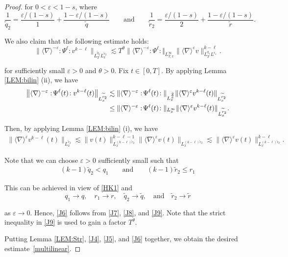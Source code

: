 \documentclass[letterpaper, 11pt,  reqno]{amsart}
\newcommand{\1}{\hspace{0.5mm}\text{I}\hspace{0.5mm}}
\newcommand{\noi}{\noindent}
\newcommand{\nb}{\nabla}
\newcommand{\eps}{\varepsilon}
\newcommand{\wt}{\widetilde}
\renewcommand{\l}{\ell}
\newcommand{\les}{\lesssim}
\newcommand{\jb}[1]
{\langle #1 \rangle}
\numberwithin{equation}{section}
\numberwithin{theorem}{section}
\begin{document}
\begin{proof}
\noi
for $0 <  \eps < 1- s$, where
\[ \frac1{\wt q_2} = \frac{\eps/(1-s)}{1} + \frac{1-\eps/(1-s)}{\wt q}
 \qquad \text{and}\qquad \frac1{\wt r_2} = \frac{\eps/(1-s)}{2} + \frac{1-\eps/(1-s)}{\wt r}   .  \] 



We also claim  that the following estimate holds:
\begin{equation}  
\big\| \jb{\nb}^{-\eps}  :\!\Psi^\l\!: v^{k-\l} \big\|_{L^{\wt q_2}_T L^{\wt r_2}_x }
 \les T^\theta \| \jb{\nb}^{-\eps} :\!\Psi^\l\!: \Vert_{L^\infty_{T, x}} 
 \|\jb{\nb}^{\eps} v \|^{k-\l}_{L^{q_1}_T L^{r_1}} .
\label{J6}
\end{equation} 


\noi
for sufficiently small $\eps > 0$
and $\theta > 0$.
%
Fix $t \in [0, T]$.  By applying Lemma \ref{LEM:bilin} (ii), we have
\begin{align}
\big\| \jb{\nb}^{-\eps}  :\!\Psi^\l(t)\!: v^{k-\l}(t) \big\|_{ L^{\wt r_2}_x }
& \les \|\jb{\nb}^{-\eps} :\!\Psi^\l(t)\!: \|_{L^\frac{2}{\eps}_x} 
\| \jb{\nb}^{\eps} v^{k-\l} (t)\|_{L^{\wt r_2 }_x} \notag\\
& \le \|\jb{\nb}^{-\eps} :\!\Psi^\l(t)\!: \|_{L^\infty_x} 
\| \jb{\nb}^{\eps} v^{k-\l} (t)\|_{L^{\wt r_2 }_x} .
\label{J7}
\end{align}


\noi
Then, by applying Lemma \ref{LEM:bilin} (i), we have
\begin{align} 
\|\jb{\nb}^{\eps} v^{k-\l}(t)  \|_{L^{\wt r_2}_x}
 \les   \| v (t) \|_{L^{(k-\l)\wt r_2}_x}^{k-\l-1} \|\jb{\nb}^{\eps} v (t) \|_{L^{(k-\l) \wt r_2}_x}
 \les   \|\jb{\nb}^{\eps} v(t) \|^{k-\l}_{L^{(k-\l) \wt r_2}_x}.
\label{J8}
\end{align}

\noi
Note that we can choose $\eps > 0$ sufficiently small such that 
\begin{align}
  (k-1) \wt q_2 <  q_1 \qquad \text{and} \qquad (k-1) \wt r_2 \le r_1 
  \label{J9}
\end{align}

\noi
This can be achieved in view of \eqref{HK1} and 
\[ q_1 \to q, \quad  r_1 \to r, \quad \wt q_2 \to \wt q ,\quad \text{and} \quad  \wt r_2 \to \wt r \] 

\noi
as $\eps \to 0$.
Hence, \eqref{J6} follows from \eqref{J7}, \eqref{J8}, and \eqref{J9}. 
Note that the strict inequality in \eqref{J9} is used to gain a factor $T^\theta$.





Putting 
 Lemma \ref{LEM:Str},  \eqref{J4}, \eqref{J5}, and \eqref{J6} together, 
we obtain the desired estimate~\eqref{multilinear}.
\end{proof} 
\end{document}
